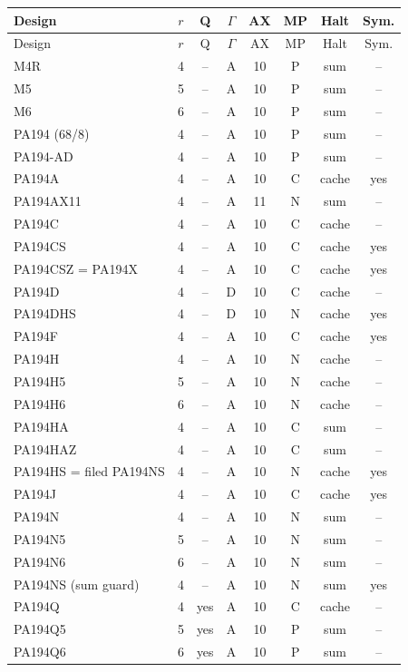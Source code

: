 \small
\begin{longtable}{@{}p{4.15cm}ccccccc@{}}
\toprule
Design & $r$ & Q & $\Gamma$ & AX & MP & Halt & Sym.\\
\midrule\endfirsthead
\toprule Design & $r$ & Q & $\Gamma$ & AX & MP & Halt & Sym.\\\midrule\endhead
\bottomrule\endfoot
M4R & 4 & -- & A & 10 & P & sum & --\\
M5 & 5 & -- & A & 10 & P & sum & --\\
M6 & 6 & -- & A & 10 & P & sum & --\\
PA194 (68/8) & 4 & -- & A & 10 & P & sum & --\\
PA194-AD & 4 & -- & A & 10 & P & sum & --\\
PA194A & 4 & -- & A & 10 & C & cache & yes\\
PA194AX11 & 4 & -- & A & 11 & N & sum & --\\
PA194C & 4 & -- & A & 10 & C & cache & --\\
PA194CS & 4 & -- & A & 10 & C & cache & yes\\
PA194CSZ = PA194X & 4 & -- & A & 10 & C & cache & yes\\
PA194D & 4 & -- & D & 10 & C & cache & --\\
PA194DHS & 4 & -- & D & 10 & N & cache & yes\\
PA194F & 4 & -- & A & 10 & C & cache & yes\\
PA194H & 4 & -- & A & 10 & N & cache & --\\
PA194H5 & 5 & -- & A & 10 & N & cache & --\\
PA194H6 & 6 & -- & A & 10 & N & cache & --\\
PA194HA & 4 & -- & A & 10 & C & sum & --\\
PA194HAZ & 4 & -- & A & 10 & C & sum & --\\
PA194HS = filed PA194NS & 4 & -- & A & 10 & N & cache & yes\\
PA194J & 4 & -- & A & 10 & C & cache & yes\\
PA194N & 4 & -- & A & 10 & N & sum & --\\
PA194N5 & 5 & -- & A & 10 & N & sum & --\\
PA194N6 & 6 & -- & A & 10 & N & sum & --\\
PA194NS (sum guard) & 4 & -- & A & 10 & N & sum & yes\\
PA194Q & 4 & yes & A & 10 & C & cache & --\\
PA194Q5 & 5 & yes & A & 10 & P & sum & --\\
PA194Q6 & 6 & yes & A & 10 & P & sum & --\\

\end{longtable}
